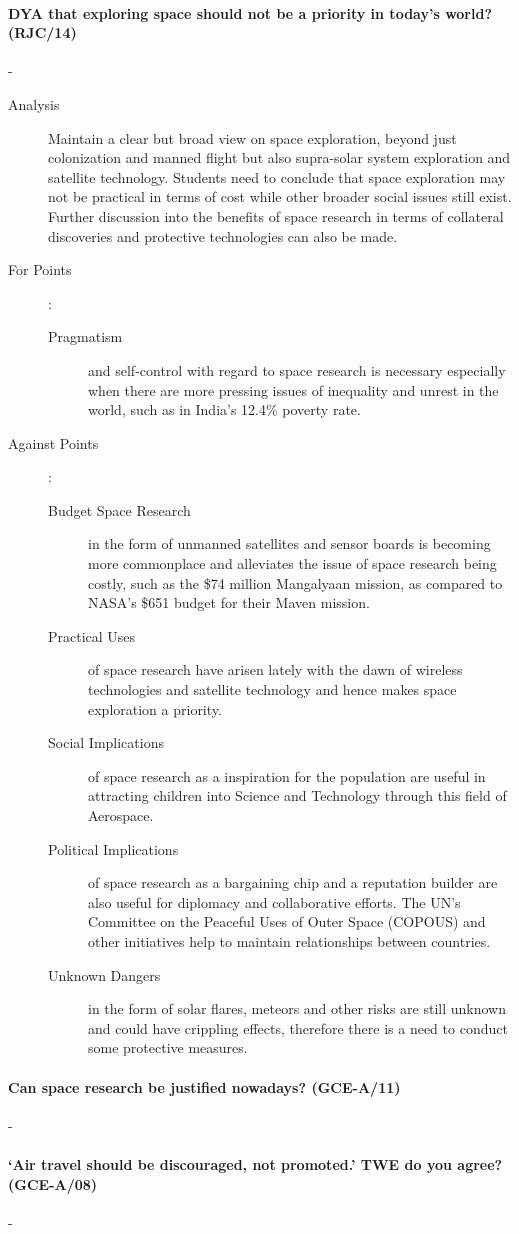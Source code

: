 \documentclass[../../main]{subfiles}
\begin{document}
\paragraph{DYA that exploring space should not be a priority in today's world? (RJC/14)}-

\begin{description}
	\item[Analysis] Maintain a clear but broad view on space exploration, beyond just colonization and manned flight but also supra-solar system exploration and satellite technology. Students need to conclude that space exploration may not be practical in terms of cost while other broader social issues still exist. Further discussion into the benefits of space research in terms of collateral discoveries and protective technologies can also be made.
	\item[For Points] :
		\begin{description}
			\item[Pragmatism] and self-control with regard to space research is necessary especially when there are more pressing issues of inequality and unrest in the world, such as in India's 12.4\% poverty rate.
		\end{description}
	\item[Against Points] :
		\begin{description}
			\item[Budget Space Research] in the form of unmanned satellites and sensor boards is becoming more commonplace and alleviates the issue of space research being costly, such as the \$74 million Mangalyaan mission, as compared to NASA's \$651 budget for their Maven mission.
			\item[Practical Uses] of space research have arisen lately with the dawn of wireless technologies and satellite technology and hence makes space exploration a priority.
			\item[Social Implications] of space research as a inspiration for the population are useful in attracting children into Science and Technology through this field of Aerospace.
			\item[Political Implications] of space research as a bargaining chip and a reputation builder are also useful for diplomacy and collaborative efforts. The UN's Committee on the Peaceful Uses of Outer Space (COPOUS) and other initiatives help to maintain relationships between countries.
			\item[Unknown Dangers] in the form of solar flares, meteors and other risks are still unknown and could have crippling effects, therefore there is a need to conduct some protective measures.
		\end{description}
\end{description}

\paragraph{Can space research be justified nowadays? (GCE-A/11)}-

\paragraph{`Air travel should be discouraged, not promoted.' TWE do you agree? (GCE-A/08)}-
\end{document}
